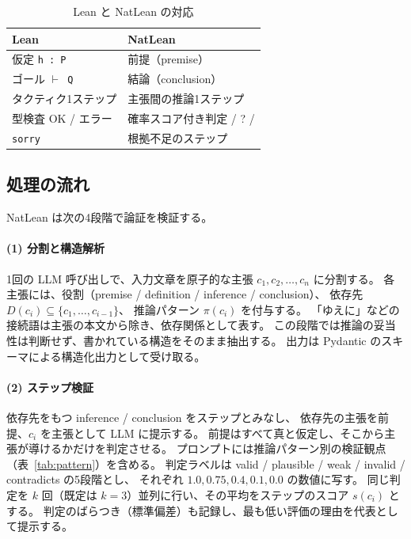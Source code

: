 \documentclass[a4paper,11pt]{ltjsarticle}
\newcommand{\okmark}{\ding{51}}
\newcommand{\ngmark}{\ding{55}}
\begin{document}
\begin{table}[t]
  \centering
  \caption{Lean と NatLean の対応}
  \label{tab:lean}
  \begin{tabular}{ll}
    \toprule
    Lean & NatLean \\
    \midrule
    仮定 \texttt{h : P} & 前提（premise） \\
    ゴール \texttt{$\vdash$ Q} & 結論（conclusion） \\
    タクティク1ステップ & 主張間の推論1ステップ \\
    型検査 OK / エラー & 確率スコア付き判定 \okmark{} / ? / \ngmark{} \\
    \texttt{sorry} & 根拠不足のステップ \\
    \bottomrule
  \end{tabular}
\end{table}

\subsection{処理の流れ}

NatLean は次の4段階で論証を検証する。

\paragraph{(1) 分割と構造解析}
1回の LLM 呼び出しで、入力文章を原子的な主張 $c_1, c_2, \dots, c_n$ に分割する。
各主張には、役割（premise / definition / inference / conclusion）、
依存先 $D(c_i) \subseteq \{c_1, \dots, c_{i-1}\}$、
推論パターン $\pi(c_i)$ を付与する。
「ゆえに」などの接続語は主張の本文から除き、依存関係として表す。
この段階では推論の妥当性は判断せず、書かれている構造をそのまま抽出する。
出力は Pydantic のスキーマによる構造化出力として受け取る。

\paragraph{(2) ステップ検証}
依存先をもつ inference / conclusion をステップとみなし、
依存先の主張を前提、$c_i$ を主張として LLM に提示する。
前提はすべて真と仮定し、そこから主張が導けるかだけを判定させる。
プロンプトには推論パターン別の検証観点（表~\ref{tab:pattern}）を含める。
判定ラベルは valid / plausible / weak / invalid / contradicts の5段階とし、
それぞれ $1.0, 0.75, 0.4, 0.1, 0.0$ の数値に写す。
同じ判定を $k$ 回（既定は $k=3$）並列に行い、その平均をステップのスコア $s(c_i)$ とする。
判定のばらつき（標準偏差）も記録し、最も低い評価の理由を代表として提示する。
\end{document}
